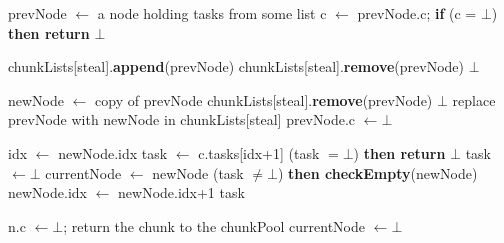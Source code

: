 \begin{algo}[!ht]
\begin{minipage}[t]{0.48\textwidth}
\begin{distribalgo}[1]
\setcounter{alg:non-fifo:lines}{\value{ALC@line}} %
\end{distribalgo}
\end{minipage}%
%
\hfill
%
\begin{minipage}[t]{0.48\textwidth}
%
\begin{distribalgo}[1]
\setcounter{ALC@line}{\value{alg:non-fifo:lines}}
\smallskip

	\STATE prevNode $\leftarrow$ a node holding tasks from some list 
	\STATE c $\leftarrow$ prevNode.c; {\bf if} (c = $\bot$) {\bf then return} $\bot$

	\STATE chunkLists[steal].{\bf append}(prevNode)  \label{alg:line:resteal-begin}
	 \label{alg:line:chown}
 		\STATE chunkLists[steal].{\bf remove}(prevNode)
 		 $\bot$ 
	\ENDINDENT

	\smallskip
	\STATE newNode $\leftarrow$ copy of prevNode \label{alg:line:copy-prev-node}
	  \STATE chunkLists[steal].{\bf remove}(prevNode)
	   $\bot$
	\ENDINDENT
	\STATE replace prevNode with newNode in chunkLists[steal]
	\STATE prevNode.c $\leftarrow \bot$ \label{alg:line:remove-chunk} \label{alg:line:resteal-end}
	
	\smallskip
	\STATE idx $\leftarrow$ newNode.idx
	\STATE task $\leftarrow$ c.tasks[idx+1] 
	 (task $= \bot$) {\bf then return} $\bot$ 
	 \label{alg:line:cas-steal} 
		\STATE task $\leftarrow \bot$
	\ENDINDENT
	\STATE currentNode $\leftarrow$ newNode
	 (task $\neq \bot$) {\bf then checkEmpty}(newNode)
	\STATE newNode.idx $\leftarrow$ newNode.idx+1
	 task
\ENDINDENT


\medskip

  	\STATE n.c $\leftarrow \bot$; return the chunk to the chunkPool
  	\STATE currentNode $\leftarrow \bot$
  \ENDINDENT
\ENDINDENT

\setcounter{alg:non-fifo:lines}{\value{ALC@line}}
\end{distribalgo}
\end{minipage}
\end{algo}

